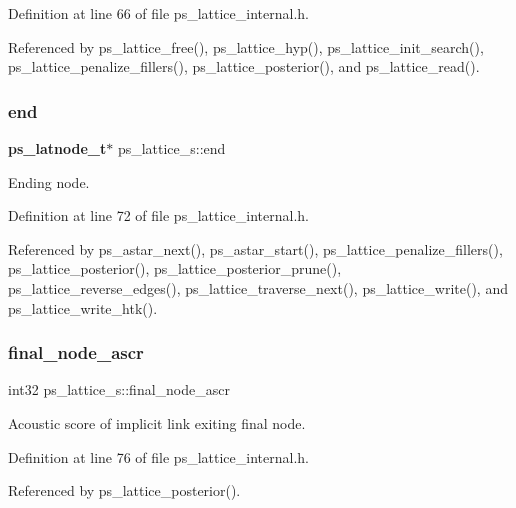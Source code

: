 Definition at line 66 of file ps\+\_\+lattice\+\_\+internal.\+h.



Referenced by ps\+\_\+lattice\+\_\+free(), ps\+\_\+lattice\+\_\+hyp(), ps\+\_\+lattice\+\_\+init\+\_\+search(), ps\+\_\+lattice\+\_\+penalize\+\_\+fillers(), ps\+\_\+lattice\+\_\+posterior(), and ps\+\_\+lattice\+\_\+read().

\mbox{\label{structps__lattice__s_a00f30e2689853d6bcb31c8005a69dc7b}} 
\subsubsection{end}
{\footnotesize\ttfamily \textbf{ ps\+\_\+latnode\+\_\+t}$\ast$ ps\+\_\+lattice\+\_\+s\+::end}



Ending node. 



Definition at line 72 of file ps\+\_\+lattice\+\_\+internal.\+h.



Referenced by ps\+\_\+astar\+\_\+next(), ps\+\_\+astar\+\_\+start(), ps\+\_\+lattice\+\_\+penalize\+\_\+fillers(), ps\+\_\+lattice\+\_\+posterior(), ps\+\_\+lattice\+\_\+posterior\+\_\+prune(), ps\+\_\+lattice\+\_\+reverse\+\_\+edges(), ps\+\_\+lattice\+\_\+traverse\+\_\+next(), ps\+\_\+lattice\+\_\+write(), and ps\+\_\+lattice\+\_\+write\+\_\+htk().

\mbox{\label{structps__lattice__s_aba113d4134c72d7405423c77bcc1247e}} 
\subsubsection{final\+\_\+node\+\_\+ascr}
{\footnotesize\ttfamily int32 ps\+\_\+lattice\+\_\+s\+::final\+\_\+node\+\_\+ascr}



Acoustic score of implicit link exiting final node. 



Definition at line 76 of file ps\+\_\+lattice\+\_\+internal.\+h.



Referenced by ps\+\_\+lattice\+\_\+posterior().


